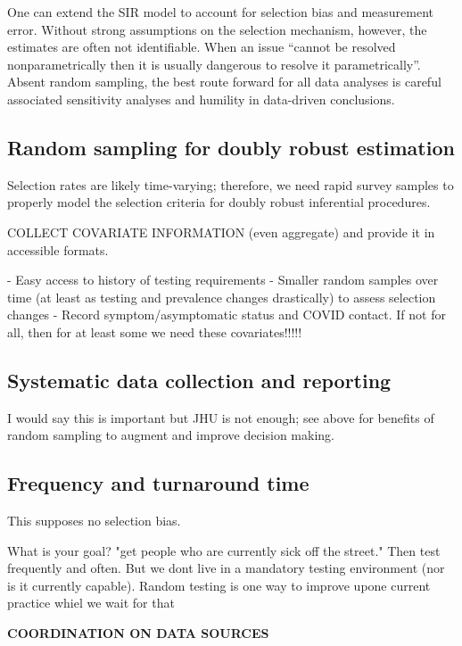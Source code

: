 \documentclass[11pt]{amsart}
\begin{document}
One can extend the SIR model to account for selection bias and measurement error. Without strong assumptions on the selection mechanism, however, the estimates are often not identifiable.  When an issue ``cannot be resolved nonparametrically then it is usually dangerous to resolve it parametrically''\citep{CoxHink74}. Absent random sampling, the best route forward for all data analyses is careful associated sensitivity analyses and humility in data-driven conclusions.

\subsection*{Random sampling for doubly robust estimation}

Selection rates are likely time-varying; therefore, we need rapid survey samples to properly model the selection criteria for doubly robust inferential procedures.

COLLECT COVARIATE INFORMATION (even aggregate) and provide it in accessible formats.

- Easy access to history of testing requirements
- Smaller random samples over time (at least as testing and prevalence changes drastically) to assess selection changes
- Record symptom/asymptomatic status and COVID contact.  If not for all, then for at least some we need these covariates!!!!!

\subsection*{Systematic data collection and reporting}

I would say this is important but JHU is not enough; see above for benefits of random sampling to augment and improve decision making.

\subsection*{Frequency and turnaround time}

This supposes no selection bias.




What is your goal?  "get people who are currently sick off the street." Then test frequently and often.  But we dont live in a mandatory testing environment (nor is it currently capable).  Random testing is one way to improve upone current practice whiel we wait for that

{\bf COORDINATION ON DATA SOURCES}
\end{document}

